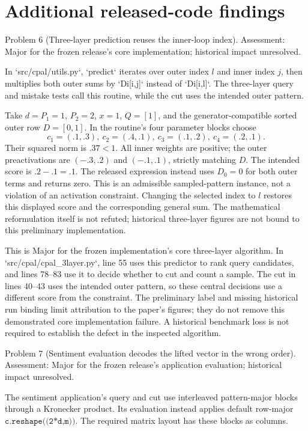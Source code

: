 \documentclass[10pt]{article}
\begin{document}
\section*{Additional released-code findings}
Problem 6 (Three-layer prediction reuses the inner-loop index).  Assessment: Major for the frozen release’s core implementation; historical impact unresolved.\par
In `src/cpal/utils.py`, `predict` iterates over outer index \(l\) and inner index \(j\), then multiplies both outer sums by `Di[i,j]` instead of `Di[i,l]`. The three-layer query and mistake tests call this routine, while the cut uses the intended outer pattern.\par
Take \(d=P_1=1\), \(P_2=2\), \(x=1\), \(Q=[1]\), and the generator-compatible sorted outer row \(D=[0,1]\). In the routine’s four parameter blocks choose \[c_1=(.1,.3),\ c_2=(.4,.1),\
 c_3=(.1,.2),\ c_4=(.2,.1).\] Their squared norm is \(.37<1\). All inner weights are positive; the outer preactivations are \((-.3,.2)\) and \((-.1,.1)\), strictly matching \(D\). The intended score is \(.2-.1=.1\). The released expression instead uses \(D_0=0\) for both outer terms and returns zero. This is an admissible sampled-pattern instance, not a violation of an activation constraint. Changing the selected index to \(l\) restores this displayed score and the corresponding general sum. The mathematical reformulation itself is not refuted; historical three-layer figures are not bound to this preliminary implementation.\par
This is Major for the frozen implementation’s core three-layer algorithm. In `src/cpal/cpal\_3layer.py`, line 55 uses this predictor to rank query candidates, and lines 78–83 use it to decide whether to cut and count a sample. The cut in lines 40–43 uses the intended outer pattern, so these central decisions use a different score from the constraint. The preliminary label and missing historical run binding limit attribution to the paper’s figures; they do not remove this demonstrated core implementation failure. A historical benchmark loss is not required to establish the defect in the inspected algorithm.\par
Problem 7 (Sentiment evaluation decodes the lifted vector in the wrong order).  Assessment: Major for the frozen release’s application evaluation; historical impact unresolved.\par
The sentiment application’s query and cut use interleaved pattern-major blocks through a Kronecker product. Its evaluation instead applies default row-major \(\texttt{c.reshape((2*d,m))}\). The required matrix layout has these blocks as columns.\par
\end{document}
